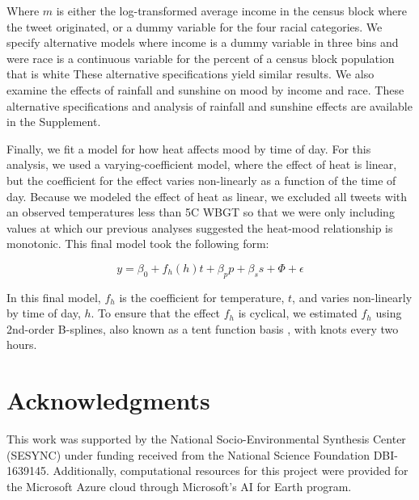 \documentclass[9pt,twocolumn,twoside,lineno]{pnas-new}
\begin{document}

Where $m$ is either the log-transformed average income in the census block where the tweet originated, or a dummy variable for the four racial categories. We specify alternative models where income is a dummy variable in three bins and were race is a continuous variable for the percent of a census block population that is white These alternative specifications yield similar results. We also examine the effects of rainfall and sunshine on mood by income and race. These alternative specifications and analysis of rainfall and sunshine effects are available in the Supplement.

Finally, we fit a model for how heat affects mood by time of day. For this analysis, we used a varying-coefficient model, where the effect of heat is linear, but the coefficient for the effect varies non-linearly as a function of the time of day. Because we modeled the effect of heat as linear, we excluded all tweets with an observed temperatures less than 5\textdegree C WBGT so that we were only including values at which our previous analyses suggested the heat-mood relationship is monotonic. This final model took the following form:

\begin{equation}
 y = \beta_0 + f_h(h)t + \beta_p p + \beta_s s + \Phi + \epsilon
 \label{mod:tod}
\end{equation}

In this final model, $f_{h}$ is the coefficient for temperature, $t$, and varies non-linearly by time of day, $h$. To ensure that the effect $f_{h}$ is cyclical, we estimated $f_{h}$ using 2nd-order B-splines, also known as a tent function basis \cite[Chapter~4.2]{wood2017generalized}, with knots every two hours.

\section*{Acknowledgments}
This work was supported by the National Socio-Environmental Synthesis Center (SESYNC) under funding received from the National Science Foundation DBI-1639145. Additionally, computational resources for this project were provided for the Microsoft Azure cloud through Microsoft's AI for Earth program.
\end{document}
